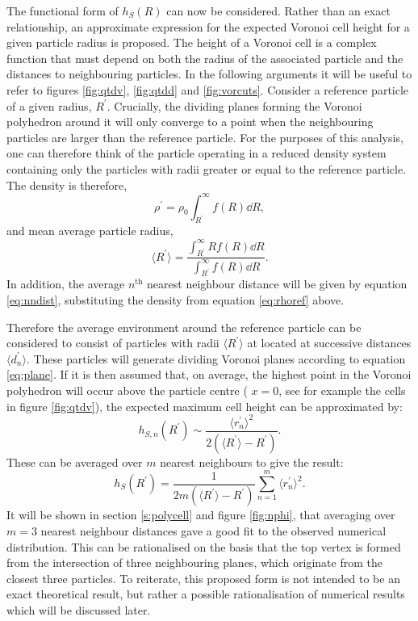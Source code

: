The functional form of $h_S\left(R\right)$ can now be considered.
Rather than an exact relationship, an approximate expression for the expected Voronoi cell height for a given particle radius is proposed.
The height of a Voronoi cell is a complex function that must depend on both the radius of the associated particle and the distances to neighbouring particles. 
In the following arguments it will be useful to refer to figures \ref{fig:qtdv}, \ref{fig:qtdd} and \ref{fig:vorcuts}.
Consider a reference particle of a given radius, $R^\prime$.
Crucially, the dividing planes forming the Voronoi polyhedron around it will only converge to a point when the neighbouring particles are larger than the reference particle.
For the purposes of this analysis, one can therefore think of the particle operating in a reduced density system containing only the particles with radii greater or equal to the reference particle.
The density is therefore,
\begin{equation}
	\label{eq:rhoref}
	\rho^\prime = \rho_0 \int_{R^\prime}^{\infty} f\left(R\right) \dd R,
\end{equation}
and mean average particle radius,
\begin{equation}
	\langle R^\prime \rangle = \frac{\int_{R^\prime}^{\infty} R f\left(R\right) \dd R }{\int_{R^\prime}^{\infty} f\left(R\right) \dd R}.
\end{equation}
In addition, the average $n^{\mathrm{th}}$ nearest neighbour distance will be given by equation \eqref{eq:nndist}, substituting the density from equation \eqref{eq:rhoref} above.

Therefore the average environment around the reference particle can be considered to consist of particles with radii $\langle R^\prime \rangle$ at located at successive distances $\langle d^\prime_n\rangle$.
These particles will generate dividing Voronoi planes according to equation \eqref{eq:plane}.
If it is then assumed that, on average, the highest point in the Voronoi polyhedron will occur above the particle centre (\ie{} $x=0$, see for example the cells in figure \ref{fig:qtdv}), the expected maximum cell height can be approximated by:
\begin{equation}
	h_{S,n}\left(R^\prime\right) \sim \frac{\langle r^\prime_n\rangle^2}{2\left(\langle R^\prime \rangle - R^\prime\right)}.
\end{equation}
These can be averaged over $m$ nearest neighbours to give the result:
\begin{equation}
	h_S\left(R^\prime\right) = \frac{1}{2m\left(\langle R^\prime\rangle-R^\prime\right)}\sum\limits_{n=1}^{m} \langle r^\prime_n \rangle^2.
\end{equation} 
It will be shown in section \ref{s:polycell} and figure \ref{fig:nphi}, that averaging over $m=3$ nearest neighbour distances gave a good fit to the observed numerical distribution.
This can be rationalised on the basis that the top vertex is formed from the intersection of three neighbouring planes, which originate from the closest three particles.
To reiterate, this proposed form is not intended to be an exact theoretical result, but rather a possible rationalisation of numerical results which will be discussed later.

